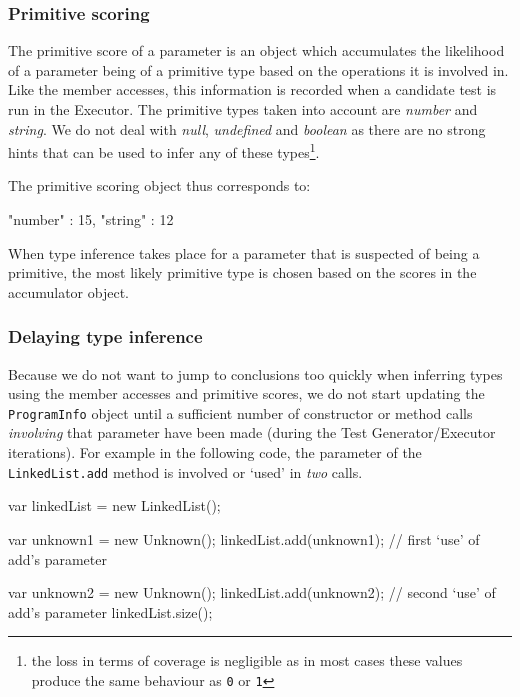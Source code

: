 \subsubsection{Primitive scoring}
The primitive score of a parameter is an object which accumulates the likelihood of a parameter being of a primitive type based on the operations it is involved in. Like the member accesses, this information is recorded when a candidate test is run in the \textsf{Executor}. The primitive types taken into account are \emph{number} and \emph{string}. We do not deal with \emph{null}, \emph{undefined} and \emph{boolean} as there are no strong hints that can be used to infer any of these types\footnote{the loss in terms of coverage is negligible as in most cases these values produce the same behaviour as \texttt{0} or \texttt{1}}.

The primitive scoring object thus corresponds to:

\begin{code}[caption=Primitive scoring, label=primitivescore]
   {
      "number" : 15,
      "string" : 12
   }
\end{code}

When type inference takes place for a parameter that is suspected of being a primitive, the most likely primitive type is chosen based on the scores in the accumulator object.

\subsubsection{Delaying type inference}
Because we do not want to jump to conclusions too quickly when inferring types using the member accesses and primitive scores, we do not start updating the \texttt{ProgramInfo} object until a sufficient number of constructor or method calls \emph{involving} that parameter have been made (during the \textsf{Test Generator/Executor} iterations). For example in the following code, the parameter of the \texttt{LinkedList.add} method is involved or `used' in \emph{two} calls.

\begin{code}[caption=Parameter uses,label=uses]
var linkedList = new LinkedList();

var unknown1 = new Unknown();
linkedList.add(unknown1); // first `use' of add's parameter

var unknown2 = new Unknown();
linkedList.add(unknown2); // second `use' of add's parameter
linkedList.size();
\end{code}

